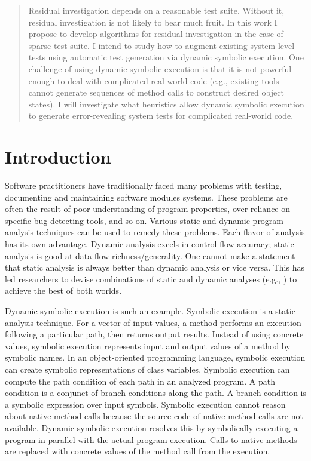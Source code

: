 \documentclass[proposal]{umthesis} %
\begin{document}
\begin{abstract}
Residual investigation depends on a reasonable test suite. Without it, residual investigation is not likely to bear much fruit.  In this work I propose to develop algorithms for residual investigation in the case of sparse test suite. I intend to study how to augment existing system-level tests using automatic test generation via dynamic symbolic execution. One challenge of using dynamic symbolic execution is that it is not powerful enough to deal with complicated real-world code (e.g., existing tools cannot generate sequences of method calls to construct desired object states). I will investigate what heuristics allow dynamic symbolic execution to  generate error-revealing system tests for complicated real-world code.

\end{abstract}

\mainmatter   %

\chapter{Introduction}
\label{chp:introduction}

Software practitioners have traditionally faced many problems with testing, documenting and maintaining software modules systems.  These problems are often the result of poor understanding of program properties, over-reliance on specific bug detecting tools, and so on. Various static and dynamic program analysis techniques can be used to remedy these problems. Each flavor of analysis has its own advantage. Dynamic analysis excels in control-flow accuracy; static analysis is good at data-flow richness/generality\cite{smaragdakis07combining}. One cannot make a statement that static analysis is always better than dynamic analysis or vice versa. This has led researchers to devise combinations of static and dynamic analyses (e.g., \cite{csallner05check,csallner06dsd-crasher,godefroid05dart,cadar05execution,tomb07variably,tillmann08pex,Islam14Generating}) to achieve the best of both worlds.  

Dynamic symbolic execution\cite{Schwartz:2010:YEW:1849417.1849981} is such an example. Symbolic execution is a static analysis technique.  For a vector of input values, a method performs an execution following a particular path, then returns output results.  Instead of using concrete values, symbolic execution represents input and output values of a method by symbolic names. In an object-oriented programming language, symbolic execution can create symbolic representations of class variables. Symbolic execution can compute the path condition of each path in an analyzed program.  A path condition is a conjunct of branch conditions along the path.  A branch condition is a symbolic expression over input symbols. Symbolic execution cannot reason about native method calls because the source code of native method calls are not available.  Dynamic symbolic execution resolves this by symbolically executing a program in parallel with the actual program execution.  Calls to native methods are replaced with concrete values of the method call from the execution.  
\end{document}
